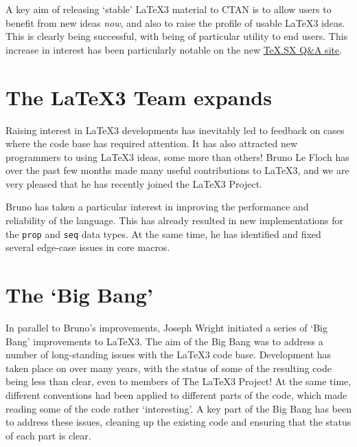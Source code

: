 \documentclass{ltnews}
\begin{document}
\maketitle

\noindent
A key aim of releasing `stable' \LaTeX3 material to CTAN is to allow users to
benefit from new ideas \emph{now}, and also to raise the profile of usable
\LaTeX3 ideas. This is clearly being successful, with  being of
particular utility to end users. This increase in interest has been
particularly notable on the new
\href{http://tex.stackexchange.com/}{TeX.SX Q\&A site}.

\section{The \LaTeX3 Team expands}

Raising interest in \LaTeX3 developments has inevitably led to feedback on
cases where the code base has required attention. It has also attracted new
programmers to using \LaTeX3 ideas, some more than others! Bruno Le Floch has
over the past few months made many useful contributions to \LaTeX3, and we are
very pleased that he has recently joined the \LaTeX3 Project.

Bruno has taken a particular interest in improving the performance and
reliability of the  language. This has already resulted in new
implementations for the \texttt{prop} and \texttt{seq} data types. At the same
time, he has identified and fixed several edge-case issues in core 
macros.

\section{The `Big Bang'}

In parallel to Bruno's improvements, Joseph Wright initiated a series of `Big
Bang' improvements to \LaTeX3. The aim of the Big Bang was to address a number
of long-standing issues with the \LaTeX3 code base. Development has taken place
on over many years, with the status of some of the resulting code being less
than clear, even to members of The \LaTeX3 Project! At the same time, different
conventions had been applied to different parts of the code, which made reading
some of the code rather `interesting'. A key part of the Big Bang has been to
address these issues, cleaning up the existing code and ensuring that the
status of each part is clear.
\end{document}
